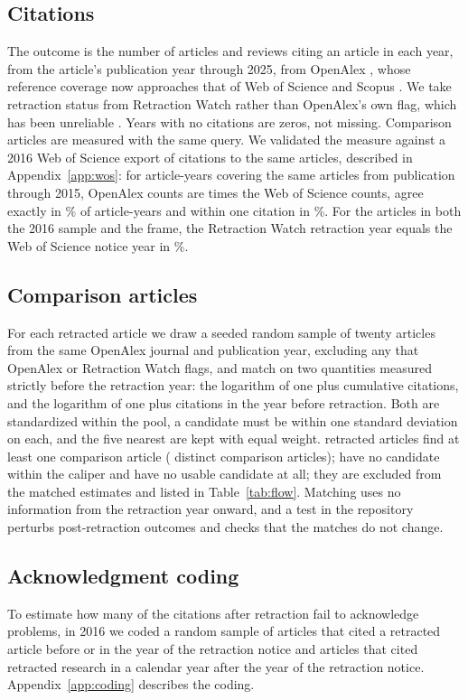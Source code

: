 \documentclass[11pt,letterpaper]{article}
\begin{document}
\subsection{Citations}
The outcome is the number of articles and reviews citing an article in each year, from the article's publication year through 2025, from OpenAlex \citep{priem2022}, whose reference coverage now approaches that of Web of Science and Scopus \citep{culbert2025reference, thelwall2025openalex}. We take retraction status from Retraction Watch rather than OpenAlex's own flag, which has been unreliable \citep{hauschke2025non}. Years with no citations are zeros, not missing. Comparison articles are measured with the same query. We validated the measure against a 2016 Web of Science export of citations to the same articles, described in Appendix~\ref{app:wos}: for \WosArticleYears{} article-years covering the same articles from publication through 2015, OpenAlex counts are \WosOpenAlexRatio{} times the Web of Science counts, agree exactly in \WosExactShare\% of article-years and within one citation in \WosWithinOneShare\%. For the \WosOverlap{} articles in both the 2016 sample and the frame, the Retraction Watch retraction year equals the Web of Science notice year in \WosNoticeYearAgreement\%.

\subsection{Comparison articles}
For each retracted article we draw a seeded random sample of twenty articles from the same OpenAlex journal and publication year, excluding any that OpenAlex or Retraction Watch flags, and match on two quantities measured strictly before the retraction year: the logarithm of one plus cumulative citations, and the logarithm of one plus citations in the year before retraction. Both are standardized within the pool, a candidate must be within one standard deviation on each, and the five nearest are kept with equal weight. \Matched{} retracted articles find at least one comparison article (\Controls{} distinct comparison articles); \Unmatched{} have no candidate within the caliper and \NoCandidates{} have no usable candidate at all; they are excluded from the matched estimates and listed in Table~\ref{tab:flow}. Matching uses no information from the retraction year onward, and a test in the repository perturbs post-retraction outcomes and checks that the matches do not change.

\subsection{Acknowledgment coding}
To estimate how many of the citations after retraction fail to acknowledge problems, in 2016 we coded a random sample of \AckSampledBefore{} articles that cited a retracted article before or in the year of the retraction notice and \AckSampledAfter{} articles that cited retracted research in a calendar year after the year of the retraction notice. Appendix~\ref{app:coding} describes the coding.
\end{document}
